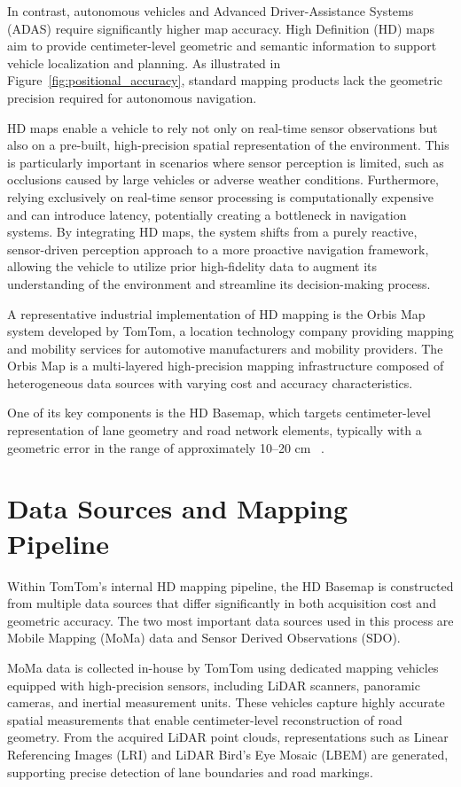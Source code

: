 In contrast, autonomous vehicles and Advanced Driver-Assistance Systems (ADAS) require significantly higher map accuracy. High Definition (HD) maps aim to provide centimeter-level geometric and semantic information to support vehicle localization and planning. As illustrated in Figure~\ref{fig:positional_accuracy}, standard mapping products lack the geometric precision required for autonomous navigation.

HD maps enable a vehicle to rely not only on real-time sensor observations but also on a pre-built, high-precision spatial representation of the environment. This is particularly important in scenarios where sensor perception is limited, such as occlusions caused by large vehicles or adverse weather conditions. Furthermore, relying exclusively on real-time sensor processing is computationally expensive and can introduce latency, potentially creating a bottleneck in navigation systems. By integrating HD maps, the system shifts from a purely reactive, sensor-driven perception approach to a more proactive navigation framework, allowing the vehicle to utilize prior high-fidelity data to augment its understanding of the environment and streamline its decision-making process.

A representative industrial implementation of HD mapping is the Orbis Map system developed by TomTom, a location technology company providing mapping and mobility services for automotive manufacturers and mobility providers. The Orbis Map is a multi-layered high-precision mapping infrastructure composed of heterogeneous data sources with varying cost and accuracy characteristics.

One of its key components is the HD Basemap, which targets centimeter-level representation of lane geometry and road network elements, typically with a geometric error in the range of approximately 10--20 cm ~\cite{tomtom2017hdmap}.

\section{Data Sources and Mapping Pipeline}
\label{sec:datasources}
Within TomTom's internal HD mapping pipeline, the HD Basemap is constructed from multiple data sources that differ significantly in both acquisition cost and geometric accuracy. The two most important data sources used in this process are Mobile Mapping (MoMa) data and Sensor Derived Observations (SDO).

MoMa data is collected in-house by TomTom using dedicated mapping vehicles equipped with high-precision sensors, including LiDAR scanners, panoramic cameras, and inertial measurement units. These vehicles capture highly accurate spatial measurements that enable centimeter-level reconstruction of road geometry. From the acquired LiDAR point clouds, representations such as Linear Referencing Images (LRI) and LiDAR Bird’s Eye Mosaic (LBEM) are generated, supporting precise detection of lane boundaries and road markings.

